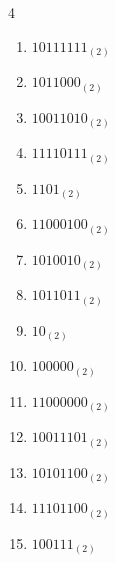\begin{multicols}{4}
\begin{enumerate}
        \phantom{$=206$}

  \item $10111111_{(2)}$

        \phantom{$=191$}

\columnbreak %

  \item $1011000_{(2)}$

        \phantom{$=88$}

  \item $10011010_{(2)}$

        \phantom{$=154$}

  \item $11110111_{(2)}$

        \phantom{$=247$}

  \item $1101_{(2)}$

        \phantom{$=13$}

  \item $11000100_{(2)}$

        \phantom{$=196$}

  \item $1010010_{(2)}$

        \phantom{$=82$}

  \item $1011011_{(2)}$

        \phantom{$=91$}

  \item $10_{(2)}$

        \phantom{$=2$}

  \item $100000_{(2)}$

        \phantom{$=32$}

  \item $11000000_{(2)}$

        \phantom{$=192$}

  \item $10011101_{(2)}$

        \phantom{$=157$}

  \item $10101100_{(2)}$

        \phantom{$=172$}

  \item $11101100_{(2)}$

        \phantom{$=236$}

  \item $100111_{(2)}$


\end{enumerate}
\end{multicols}

